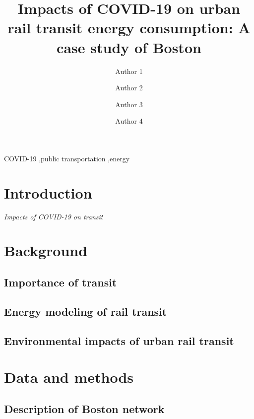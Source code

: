 \documentclass[preprint, 11pt]{elsarticle}
\newcommand{\?}{\stackrel{?}{=}}
\begin{document}
 
 
\begin{frontmatter}
  
\title{Impacts of COVID-19 on urban rail transit energy consumption: A case study of Boston}
\author[umass]{Author 1}
\author[umass]{Author 2} 
\author[umass]{Author 3}
\author[umass]{Author 4}


\address[umass]{Department of Civil and Environmental Engineering, University of Massachusetts Amherst, MA 01003, United States}

\begin{abstract}
\end{abstract}

\begin{keyword}
  COVID-19 \sep public transportation \sep energy
\end{keyword}

\end{frontmatter}

\section{Introduction}
{\it Impacts of COVID-19 on transit}

\section{Background}
\subsection{Importance of transit}

\subsection{Energy modeling of rail transit}

\subsection{Environmental impacts of urban rail transit}

\section{Data and methods}
\subsection{Description of Boston network}
\end{document}
